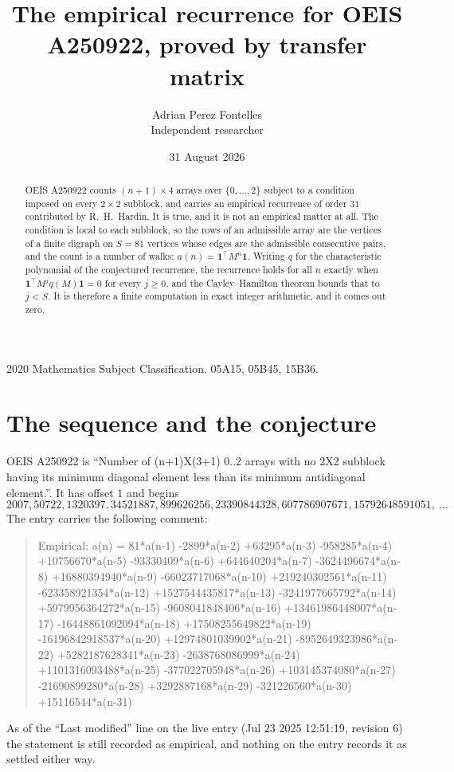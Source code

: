 \documentclass[11pt,a4paper]{article}
\title{The empirical recurrence for OEIS A250922, proved by transfer matrix}
\author{Adrian Perez Fontelles\\ \small Independent researcher}
\date{31 August 2026}
\theoremstyle{plain}
\theoremstyle{definition}
\begin{document}
\maketitle

\begin{abstract}
OEIS A250922 counts $(n+1)\times4$ arrays over $\{0,\dots,2\}$ subject to a condition imposed on
every $2\times2$ subblock, and carries an empirical recurrence of order $31$ contributed
by R.~H.~Hardin. It is true, and it is not an empirical matter at all. The condition is local
to each subblock, so the rows of an admissible array are the vertices of a finite digraph
on $S=81$ vertices whose edges are the admissible consecutive pairs, and the count is a
number of walks: $a(n)=\mathbf{1}^{\!\top}M^{n}\mathbf{1}$. Writing $q$
for the characteristic polynomial of the conjectured recurrence, the recurrence holds for all
$n$ exactly when $\mathbf{1}^{\!\top}M^{j}q(M)\mathbf{1}=0$ for every $j\ge0$, and the
Cayley--Hamilton theorem bounds that to $j<S$. It is therefore a finite computation in exact
integer arithmetic, and it comes out zero.
\end{abstract}

\noindent\small 2020 Mathematics Subject Classification. 05A15, 05B45, 15B36.\normalsize

\section{The sequence and the conjecture}

OEIS A250922 is ``Number of (n+1)X(3+1) 0..2 arrays with no 2X2 subblock having its minimum diagonal element less than its minimum antidiagonal element.''. It has offset $1$ and begins
\[
2007, 50722, 1320397, 34521887, 899626256, 23390844328, 607786907671, 15792648591051,\ \dots
\]
The entry carries the following comment:
\begin{quote}\small
Empirical: a(n) = 81*a(n-1) -2899*a(n-2) +63295*a(n-3) -958285*a(n-4) +10756670*a(n-5) -93330409*a(n-6) +644640204*a(n-7) -3624496674*a(n-8) +16880394940*a(n-9) -66023717068*a(n-10) +219240302561*a(n-11) -623358921354*a(n-12) +1527544435817*a(n-13) -3241977665792*a(n-14) +5979956364272*a(n-15) -9608041848406*a(n-16) +13461986448007*a(n-17) -16448861092094*a(n-18) +17508255649822*a(n-19) -16196842918537*a(n-20) +12974801039902*a(n-21) -8952649323986*a(n-22) +5282187628341*a(n-23) -2638768086999*a(n-24) +1101316093488*a(n-25) -377022705948*a(n-26) +103145374080*a(n-27) -21690899280*a(n-28) +3292887168*a(n-29) -321226560*a(n-30) +15116544*a(n-31)
\end{quote}
As of the ``Last modified'' line on the live entry (Jul 23 2025 12:51:19, revision 6) the statement is
still recorded as empirical, and nothing on the entry records it as settled either way.
\end{document}
